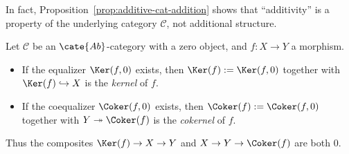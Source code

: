 In fact, Proposition~\ref{prop:additive-cat-addition} shows that ``additivity'' is a property of the underlying category $\mathcal C$, not additional structure.

\begin{definition}
	Let $\mathcal C$ be an $\cate{Ab}$-category with a zero object, and $f:X\to Y$ a morphism.
	\begin{itemize}
		\item If the equalizer $\Ker(f,0)$ exists, then $\Ker(f):=\Ker(f,0)$ together with $\Ker(f)\hookrightarrow X$ is the \emph{kernel} of $f$.
		\item If the coequalizer $\Coker(f,0)$ exists, then $\Coker(f):=\Coker(f,0)$ together with $Y\twoheadrightarrow\Coker(f)$ is the \emph{cokernel} of $f$.
	\end{itemize}
	Thus the composites $\Ker(f)\to X\to Y$ and $X\to Y\to\Coker(f)$ are both $0$.
\end{definition}

